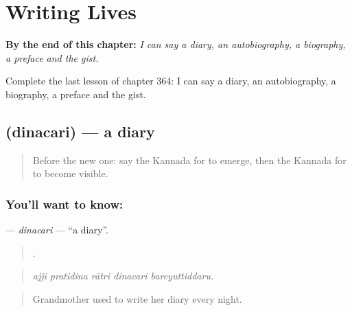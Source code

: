 
\chapter{Writing Lives}
\label{ch:ka-writing-lives}

\begin{chapteropening}
\textbf{By the end of this chapter:} \emph{I can say a diary, an autobiography, a biography, a preface and the gist.}

Complete the last lesson of chapter 364: I can say a diary, an autobiography, a biography, a preface and the gist.
\end{chapteropening}

\section[\texorpdfstring{\kn{ದಿನಚರಿ} (dinacari)}{ದಿನಚರಿ (dinacari)}]{ (dinacari) — a diary}

\label{lesson:KA-C364-dinacari}



\begin{quote}
Before the new one: say the Kannada for to emerge, then the Kannada for to become visible.
\end{quote}

\subsection*{You'll want to know: }
\textbf{} — \emph{dinacari} — \textquotedblleft{}a diary\textquotedblright{}.

\begin{quote}
    .
\end{quote}

\begin{quote}
\emph{ajji pratidina rātri dinacari bareyuttiddaru.}
\end{quote}

\begin{quote}
Grandmother used to write her diary every night.
\end{quote}

